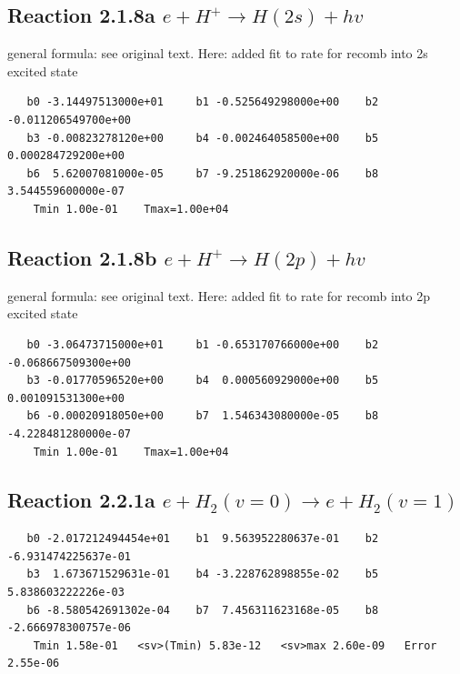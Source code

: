 \documentclass[12pt,dvipdfmx]{article}
\begin{document}
\subsection{
Reaction 2.1.8a $  e + H^+ \rightarrow H(2s) + hv $}
general formula: see original text. Here:  added fit to rate for recomb into 2s excited state

\begin{small}\begin{verbatim}
   b0 -3.14497513000e+01     b1 -0.525649298000e+00    b2 -0.011206549700e+00
   b3 -0.00823278120e+00     b4 -0.002464058500e+00    b5  0.000284729200e+00
   b6  5.62007081000e-05     b7 -9.251862920000e-06    b8  3.544559600000e-07
    Tmin 1.00e-01    Tmax=1.00e+04
\end{verbatim}\end{small}



\subsection{
Reaction 2.1.8b $  e + H^+ \rightarrow H(2p) + hv $}
general formula: see original text. Here:  added fit to rate for recomb into 2p excited state

\begin{small}\begin{verbatim}
   b0 -3.06473715000e+01     b1 -0.653170766000e+00    b2 -0.068667509300e+00
   b3 -0.01770596520e+00     b4  0.000560929000e+00    b5  0.001091531300e+00
   b6 -0.00020918050e+00     b7  1.546343080000e-05    b8 -4.228481280000e-07
    Tmin 1.00e-01    Tmax=1.00e+04
\end{verbatim}\end{small}

\newpage
\subsection{
Reaction 2.2.1a $  e + H_2(v=0) \rightarrow e + H_2(v=1)$}


\begin{small}\begin{verbatim}
   b0 -2.017212494454e+01    b1  9.563952280637e-01    b2 -6.931474225637e-01
   b3  1.673671529631e-01    b4 -3.228762898855e-02    b5  5.838603222226e-03
   b6 -8.580542691302e-04    b7  7.456311623168e-05    b8 -2.666978300757e-06
    Tmin 1.58e-01   <sv>(Tmin) 5.83e-12   <sv>max 2.60e-09   Error 2.55e-06
\end{verbatim}\end{small}
\end{document}
